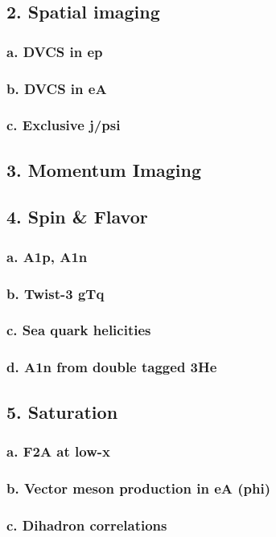 \documentclass{report}
\begin{document}
\subsection{2. Spatial imaging}
\subsubsection{a. DVCS in ep}
\subsubsection{b. DVCS in eA}
\subsubsection{c. Exclusive j/psi}
\subsection{3. Momentum Imaging}
\subsection{4. Spin & Flavor}
\subsubsection{a. A1p, A1n}
\subsubsection{b. Twist-3 gTq}
\subsubsection{c. Sea quark helicities}
\subsubsection{d. A1n from double tagged 3He}
\subsection{5. Saturation}
\subsubsection{a. F2A at low-x}
\subsubsection{b. Vector meson production in eA (phi)}
\subsubsection{c. Dihadron correlations}
\end{document}

